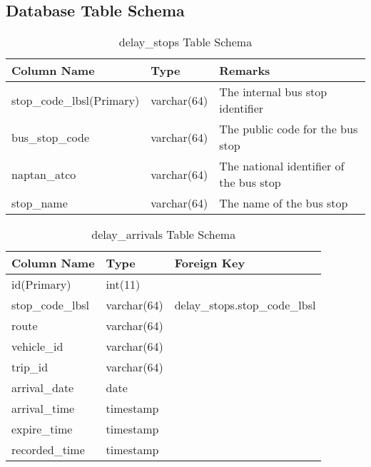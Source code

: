 \begin{appendices}
\chapter{Database Table Schema}

\begin{table}[h]
\centering
\begin{tabular}{@{}lll@{}} \toprule
Column Name & Type & Remarks\\ \midrule
stop\_code\_lbsl(Primary) & varchar(64) & The internal bus stop identifier \\
bus\_stop\_code & varchar(64) &  The public code for the bus stop \\
naptan\_atco & varchar(64) & The national identifier of the bus stop \\
stop\_name & varchar(64) & The name of the bus stop \\
\bottomrule
\end{tabular}
\caption{delay\_stops Table Schema}
\label{table:delay_stops}
\end{table}

\begin{table}[h]
\centering
\begin{tabular}{@{}lll@{}} \toprule
Column Name & Type & Foreign Key\\ \midrule
id(Primary) & int(11)  \\
stop\_code\_lbsl & varchar(64) & delay\_stops.stop\_code\_lbsl \\
route & varchar(64) &  \\
vehicle\_id & varchar(64) & \\
trip\_id & varchar(64) & \\
arrival\_date & date &  \\
arrival\_time & timestamp &  \\
expire\_time & timestamp & \\
recorded\_time & timestamp & \\ \bottomrule
\end{tabular}
\caption{delay\_arrivals Table Schema}
\label{table:delay_arrivals_schema}
\end{table}


\end{appendices}
